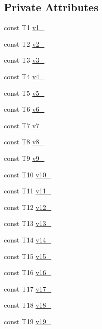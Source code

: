 \subsection*{\-Private \-Attributes}
\begin{DoxyCompactItemize}
\item 
const \-T1 \hyperlink{classtesting_1_1internal_1_1ValueArray19_aac1d0654cc6c1aceb4a5d0fa7a98042e}{v1\-\_\-}
\item 
const \-T2 \hyperlink{classtesting_1_1internal_1_1ValueArray19_a9f0a8ce6ce2fd27e980c4c51a7a7256a}{v2\-\_\-}
\item 
const \-T3 \hyperlink{classtesting_1_1internal_1_1ValueArray19_a4f8257321a2eab0456239174d6712d5e}{v3\-\_\-}
\item 
const \-T4 \hyperlink{classtesting_1_1internal_1_1ValueArray19_aac184059fee257381ccae81d8d112f85}{v4\-\_\-}
\item 
const \-T5 \hyperlink{classtesting_1_1internal_1_1ValueArray19_a1f3e0ada8419ed2e17cc61e6c0c54404}{v5\-\_\-}
\item 
const \-T6 \hyperlink{classtesting_1_1internal_1_1ValueArray19_a13d84d5824617bbc6fb1a6b3ee3cb745}{v6\-\_\-}
\item 
const \-T7 \hyperlink{classtesting_1_1internal_1_1ValueArray19_a4063f0b7a528133d018ee488ba44a9a3}{v7\-\_\-}
\item 
const \-T8 \hyperlink{classtesting_1_1internal_1_1ValueArray19_a596bc5260b2474271d1f6910ff6f665d}{v8\-\_\-}
\item 
const \-T9 \hyperlink{classtesting_1_1internal_1_1ValueArray19_a6356e16cf54a9dfac8525f20242af31e}{v9\-\_\-}
\item 
const \-T10 \hyperlink{classtesting_1_1internal_1_1ValueArray19_a147ca4457ea439b00a93087231ff77ef}{v10\-\_\-}
\item 
const \-T11 \hyperlink{classtesting_1_1internal_1_1ValueArray19_a12a4baf9ab57c7e9b5b4f1612e59e529}{v11\-\_\-}
\item 
const \-T12 \hyperlink{classtesting_1_1internal_1_1ValueArray19_a35ffe6d4d723857722ab319a235eddfc}{v12\-\_\-}
\item 
const \-T13 \hyperlink{classtesting_1_1internal_1_1ValueArray19_a8c6e803e306975fc3ed6717875688efa}{v13\-\_\-}
\item 
const \-T14 \hyperlink{classtesting_1_1internal_1_1ValueArray19_a812dbcac0513d6c5242ff4df1b8da6dd}{v14\-\_\-}
\item 
const \-T15 \hyperlink{classtesting_1_1internal_1_1ValueArray19_ab34fb63edf7d2b53ddbf7ac163123da0}{v15\-\_\-}
\item 
const \-T16 \hyperlink{classtesting_1_1internal_1_1ValueArray19_a8b2b80d31925c1583c3e694d2bf235c5}{v16\-\_\-}
\item 
const \-T17 \hyperlink{classtesting_1_1internal_1_1ValueArray19_a9f59ea9e6f3642f77227dd1f7882d649}{v17\-\_\-}
\item 
const \-T18 \hyperlink{classtesting_1_1internal_1_1ValueArray19_ad07972ee98135c8deb090fc891a04e3e}{v18\-\_\-}
\item 
const \-T19 \hyperlink{classtesting_1_1internal_1_1ValueArray19_a3ad77b5b43c14332dabc9d47c8907e7f}{v19\-\_\-}
\end{DoxyCompactItemize}


